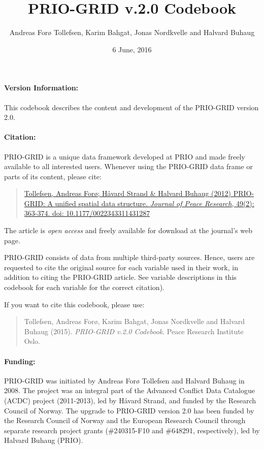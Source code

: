 \documentclass[]{book}
\title{PRIO-GRID v.2.0 Codebook}
\author{Andreas Forø Tollefsen, Karim Bahgat, Jonas Nordkvelle and Halvard
Buhaug}
\date{6 June, 2016}
\begin{document}
\frontmatter
\maketitle

\paragraph{Version Information:}\label{version-information}

This codebook describes the content and development of the PRIO-GRID
version 2.0.

\paragraph{Citation:}\label{citation}

PRIO-GRID is a unique data framework developed at PRIO and made freely
available to all interested users. Whenever using the PRIO-GRID data
frame or parts of its content, please cite:

\begin{quote}
\href{http://jpr.sagepub.com/content/49/2/363}{Tollefsen, Andreas Forø;
Håvard Strand \& Halvard Buhaug (2012) PRIO-GRID: A unified spatial data
structure. \emph{Journal of Peace Research}, 49(2): 363-374. doi:
10.1177/0022343311431287}
\end{quote}

The article is \emph{open access} and freely available for download at
the journal's web page.

PRIO-GRID consists of data from multiple third-party sources. Hence,
users are requested to cite the original source for each variable used
in their work, in addition to citing the PRIO-GRID article. See variable
descriptions in this codebook for each variable for the correct
citation).

If you want to cite this codebook, please use:

\begin{quote}
Tollefsen, Andreas Forø, Karim Bahgat, Jonas Nordkvelle and Halvard
Buhaug (2015). \emph{PRIO-GRID v.2.0 Codebook}. Peace Research Institute
Oslo.
\end{quote}

\paragraph{Funding:}\label{funding}

PRIO-GRID was initiated by Andreas Forø Tollefsen and Halvard Buhaug in
2008. The project was an integral part of the Advanced Conflict Data
Catalogue (ACDC) project (2011-2013), led by Håvard Strand, and funded
by the Research Council of Norway. The upgrade to PRIO-GRID version 2.0
has been funded by the Research Council of Norway and the European
Research Council through separate research project grants (\#240315-F10
and \#648291, respectively), led by Halvard Buhaug (PRIO).
\end{document}
